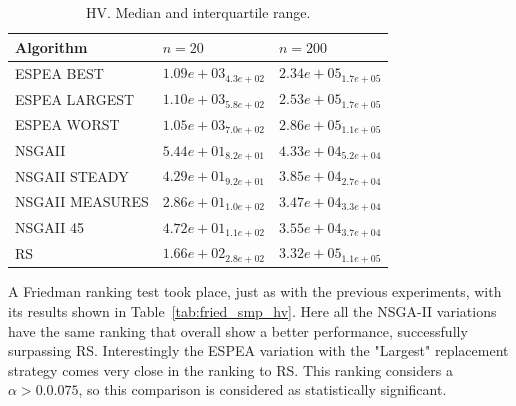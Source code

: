 \begin{table}[H]
    \centering
    {%
    \begin{tabular}{lll}
    \hline
    Algorithm & $n = 20$ & $n = 200 $ \\
    \hline
    ESPEA BEST & $  1.09e+03_{ 4.3e+02}$ & $  2.34e+05_{ 1.7e+05}$ \\
    ESPEA LARGEST & $  1.10e+03_{ 5.8e+02}$ & $  2.53e+05_{ 1.7e+05}$ \\
    ESPEA WORST & $  1.05e+03_{ 7.0e+02}$ & $  2.86e+05_{ 1.1e+05}$ \\
    NSGAII & $  5.44e+01_{ 8.2e+01}$ & $  4.33e+04_{ 5.2e+04}$ \\
    NSGAII STEADY & \cellcolor{gray25} $  4.29e+01_{ 9.2e+01}$ & $  3.85e+04_{ 2.7e+04}$ \\
    NSGAII MEASURES & \cellcolor{gray95} $  2.86e+01_{ 1.0e+02}$ & \cellcolor{gray95} $  3.47e+04_{ 3.3e+04}$ \\
    NSGAII 45 & $  4.72e+01_{ 1.1e+02}$ & \cellcolor{gray25} $  3.55e+04_{ 3.7e+04}$ \\
    RS & $  1.66e+02_{ 2.8e+02}$ & $  3.32e+05_{ 1.1e+05}$ \\
    \hline
    \end{tabular}%
    }
    \caption{HV. Median and interquartile range.}
    \label{tab:me_int_smp_hv}
\end{table}

A Friedman ranking test took place, just as with the previous experiments, with its results shown in Table~\ref{tab:fried_smp_hv}. Here all the NSGA-II variations have the same ranking that overall show a better performance, successfully surpassing RS. Interestingly the ESPEA variation with the "Largest" replacement strategy comes very close in the ranking to RS. This ranking considers a $\alpha > 0.0.075$, so this comparison is considered as statistically significant.


